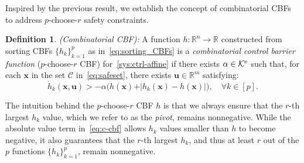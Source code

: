 \documentclass[journal,twoside,web]{ieeecolor}
\newcommand{\real}{\mathbb{R}}
\newcommand{\until}[1]{[#1]}
\newcommand{\map}[3]{#1:#2 \rightarrow #3}
\newcommand{\longthmtitle}[1]{\mbox{}{\textit{(#1):}}}
\newcommand{\Cc}{\mathcal{C}}
\newcommand{\Kc}{\mathcal{K}}
\newcommand{\Ke}{\Kc^{\rm e}}
\theoremstyle{definition}
\newtheorem{definition}{Definition}
\newcommand{\bu}{\mathbf{u}}
\newcommand{\bx}{\mathbf{x}}
\begin{document}
Inspired by the previous result, we establish the concept of combinatorial CBFs to address $p$-choose-$r$ safety constraints.
\begin{definition}\longthmtitle{Combinatorial CBF}
    A function $\map{h}{\real^n}{\real}$ constructed from sorting CBFs $\{h_k\}_{k=1}^p$ as in~\eqref{eq:sorting_CBFs} is a \textit{combinatorial control barrier function} ($p$-choose-$r$ CBF) for~\eqref{sys:ctrl-affine} if there exists $\alpha\in\Ke$ such that, for each $\bx$ in the set $\Cc$ in~\eqref{eq:safeset}, there exists $\bu\in\real^m$ satisfying:
   \begin{equation}
    \dot h_k(\bx,\bu) > -\alpha \big( h(\bx)+\vert h_k(\bx)-h(\bx)\vert \big), \quad \forall k\in\until{p}.
    \label{eq:c-cbf}
    \end{equation}
\end{definition}
The intuition behind the $p$-choose-$r$ CBF $h$ is that we always ensure that the $r$-th largest $h_k$ value, which we refer to as the \textit{pivot}, remains nonnegative. While the absolute value term in~\eqref{eq:c-cbf} allows $h_k$ values smaller than $h$ to become negative, it also guarantees that the $r$-th largest $h_k$, and thus at least $r$ out of the $p$ functions $\{h_k\}_{k=1}^p$, remain nonnegative. 
\end{document}
